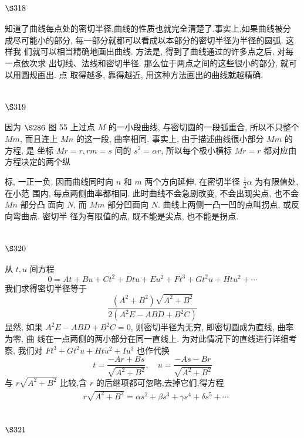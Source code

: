 \section{$\S 318$}

知道了曲线每点处的密切半径,曲线的性质也就完全清楚了.事实上,如果曲线被分 成尽可能小的部分, 每一部分就都可以看成以本部分的密切半径为半径的圆弧. 这样我 们就可以相当精确地画出曲线. 方法是, 得到了曲线通过的许多点之后, 对每一点依次求 出切线、法线和密切半径. 那么位于两点之间的这些很小的部分, 就可以用圆规画出. 点 取得越多, 靠得越近, 用这种方法画出的曲线就越精确.

\section{$\S 319$}

因为 $\S 286$ 图 55 上过点 $M$ 的一小段曲线, 与密切圆的一段弧重合, 所以不只整个 $M m$, 而且连上 $M n$ 的这一段, 曲率相同. 事实上, 由于描述曲线很小部分 $M m$ 的方程, 是 坐标 $M r=r, r m=s$ 间的 $s^{2}=\alpha r$, 所以每个极小横标 $M r=r$ 都对应由方程决定的两个纵

标, 一正一负. 因而曲线同时向 $n$ 和 $m$ 两个方向延伸, 在密切半径 $\frac{1}{2} \alpha$ 为有限值处, 在小范 围内, 每点两侧曲率都相同. 此时曲线不会急剧改变, 不会出现尖点, 也不会 $M n$ 部分凸 面向 $N$, 而 $M m$ 部分凹面向 $N$. 曲线上两侧一凸一凹的点叫拐点, 或反向弯曲点. 密切半 径为有限值的点, 既不能是尖点, 也不能是拐点.

\section{$\S 320$}

从 $t, u$ 间方程
\[
0=A t+B u+C t^{2}+D t u+E u^{2}+F t^{3}+G t^{2} u+H t u^{2}+\cdots
\]
我们求得密切半径等于
\[
\frac{\left(A^{2}+B^{2}\right) \sqrt{A^{2}+B^{2}}}{2\left(A^{2} E-A B D+B^{2} C\right)}
\]
显然, 如果 $A^{2} E-A B D+B^{2} C=0$, 则密切半径为无穷, 即密切圆成为直线, 曲率为零, 曲 线在一点两侧的两小部分在同一直线上. 为对此情况下的直线进行详细考察, 我们对 $F t^{3}+G t^{2} u+H t u^{2}+I u^{3}$ 也作代换
\[
t=\frac{-A r+B s}{\sqrt{A^{2}+B^{2}}}, \quad u=\frac{-A s-B r}{\sqrt{A^{2}+B^{2}}}
\]
与 $r \sqrt{A^{2}+B^{2}}$ 比较,含 $r$ 的后继项都可忽略,去掉它们,得方程
\[
\begin{aligned}
& r \sqrt{A^{2}+B^{2}}=\alpha s^{2}+\beta s^{3}+\gamma s^{4}+\delta s^{5}+\cdots
\end{aligned}
\]
\section{$\S 321$}

